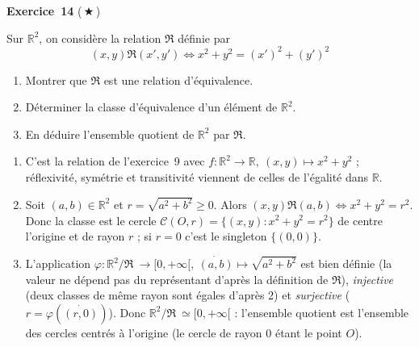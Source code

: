 \documentclass[11pt,a4paper]{article}
\newcommand{\R}{\mathbb{R}}\newcommand{\N}{\mathbb{N}}\newcommand{\Z}{\mathbb{Z}}
\newcommand{\eqv}{\mathfrak{R}}
\begin{document}
	\medskip\noindent\textbf{\Large\color{bleu}Exercice~14} \textnormal{(\,$\bigstar$\,)}\nopagebreak
	\begin{enonce}
		Sur $\mathbb{R}^2$, on considère la relation $\mathfrak{R}$ définie par
		\[
		(x,y)\mathfrak{R}(x',y') \Longleftrightarrow x^2 + y^2 = (x')^2 + (y')^2
		\]
		\begin{enumerate}
			\item Montrer que $\mathfrak{R}$ est une relation d'équivalence.
			\item Déterminer la classe d'équivalence d'un élément de $\mathbb{R}^2$.
			\item En déduire l'ensemble quotient de $\mathbb{R}^2$ par $\mathfrak{R}$.
		\end{enumerate}
	\end{enonce}
	\begin{corrige}
		\begin{enumerate}
			\item C'est la relation de l'exercice~9 avec $f:\R^2\to\R,\ (x,y)\mapsto x^2+y^2$ ; réflexivité, symétrie et transitivité viennent de celles de l'égalité dans $\R$.
			\item Soit $(a,b)\in\R^2$ et $r=\sqrt{a^2+b^2}\geq0$. Alors $(x,y)\eqv(a,b)\iff x^2+y^2=r^2$. Donc la classe est le cercle $\mathcal C(O,r)=\{(x,y):x^2+y^2=r^2\}$ de centre l'origine et de rayon $r$ ; si $r=0$ c'est le singleton $\{(0,0)\}$.
			\item L'application $\varphi:\R^2/\!\eqv\ \to[0,+\infty[,\ \dot{(a,b)}\mapsto\sqrt{a^2+b^2}$ est bien définie (la valeur ne dépend pas du représentant d'après la définition de $\eqv$), \emph{injective} (deux classes de même rayon sont égales d'après 2) et \emph{surjective} ($r=\varphi(\dot{(r,0)})$). Donc $\R^2/\!\eqv\ \simeq[0,+\infty[$ : l'ensemble quotient est l'ensemble des cercles centrés à l'origine (le cercle de rayon $0$ étant le point $O$).
		\end{enumerate}
	\end{corrige}
	
\end{document}
